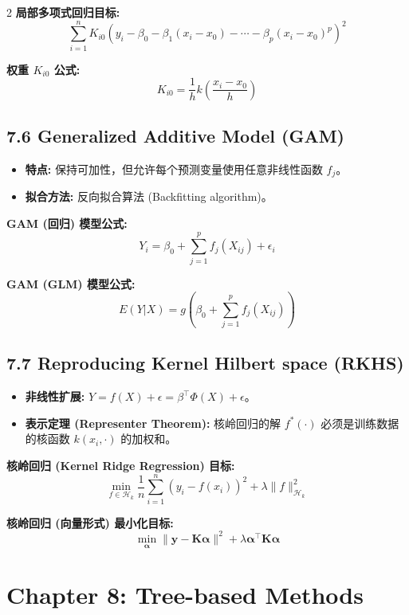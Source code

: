 \documentclass[6pt,a4paper]{ctexart}
\begin{document}
\begin{multicols}{2}
\textbf{局部多项式回归目标:}
$$ \sum_{i=1}^{n} K_{i0} \left( y_{i} - \beta_{0} - \beta_{1}(x_{i}-x_{0}) - \cdots - \beta_{p}(x_{i}-x_{0})^{p} \right)^{2} $$

\textbf{权重 $K_{i0}$ 公式:}
$$ K_{i0}=\frac{1}{h} k\left( \frac{x_{i}-x_{0}}{h} \right) $$

\subsection*{7.6 Generalized Additive Model (GAM)}
\begin{itemize}
    \item \textbf{特点:} 保持可加性，但允许每个预测变量使用任意非线性函数 $f_j$。
    \item \textbf{拟合方法:} 反向拟合算法 (Backfitting algorithm)。
\end{itemize}

\textbf{GAM (回归) 模型公式:}
$$ Y_{i}=\beta_{0}+\sum_{j=1}^{p}f_{j}(X_{ij})+\epsilon_{i} $$

\textbf{GAM (GLM) 模型公式:}
$$ E(Y|X)=g\left(\beta_{0}+\sum_{j=1}^{p}f_{j}(X_{ij})\right) $$

\subsection*{7.7 Reproducing Kernel Hilbert space (RKHS)}
\begin{itemize}
    \item \textbf{非线性扩展:} $ Y = f(X) + \epsilon = \beta^{\top}\Phi(X) + \epsilon $。
    \item \textbf{表示定理 (Representer Theorem):} 核岭回归的解 $f^{\ast}(\cdot)$ 必须是训练数据的核函数 $k(x_i, \cdot)$ 的加权和。
\end{itemize}

\textbf{核岭回归 (Kernel Ridge Regression) 目标:}
$$ \min_{f\in\mathcal{H}_{k}} \frac{1}{n} \sum_{i=1}^{n} (y_{i}-f(x_{i}))^{2} + \lambda \|f\|_{\mathcal{H}_{k}}^{2} $$

\textbf{核岭回归 (向量形式) 最小化目标:}
$$ \min_{\mathbf{\alpha}} \|\mathbf{y}-\mathbf{K}\mathbf{\alpha}\|^{2} + \lambda \mathbf{\alpha}^{\top}\mathbf{K}\mathbf{\alpha} $$

\section*{Chapter 8: Tree-based Methods}


\end{multicols}
\end{document}

